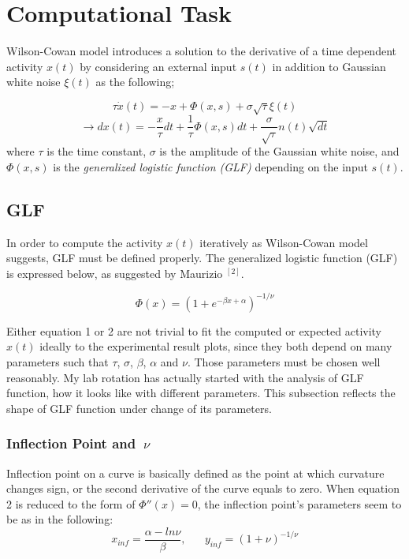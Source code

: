\documentclass[twocolumn]{article}
\begin{document}
 \section{Computational Task}
Wilson-Cowan model introduces a solution to the derivative of a time dependent activity $x(t)$ by considering an external input $s(t)$ in addition to Gaussian white noise $\xi(t)$ as the following;

\begin{equation}
 \tau\dot{x}(t)=-x+\Phi(x,s)+\sigma\sqrt{\tau}\xi(t)
\end{equation}
\begin{equation*}
\rightarrow dx(t)=-\frac{x}{\tau}dt+\frac{1}{\tau}\Phi(x,s)dt+\frac{\sigma}{\sqrt{\tau}}n(t)\sqrt{dt} 
\end{equation*}
where $\tau$ is the time constant, $\sigma$ is the amplitude of the Gaussian white noise, and $\Phi(x,s)$ is the \textit{generalized logistic function (GLF)} depending on the input $s(t)$.

\subsection{GLF}
In order to compute the activity $x(t)$ iteratively as Wilson-Cowan model suggests, GLF must be defined properly. The generalized logistic function (GLF) is expressed below, as suggested by Maurizio $^{[2]}$. 

\begin{equation}
 \Phi(x)=(1+e^{-\beta x+\alpha})^{-1/\nu}
\end{equation}

Either equation 1 or 2 are not trivial to fit the computed or expected activity $x(t)$ ideally to the experimental result plots, since they both depend on many parameters such that $\tau$, $\sigma$, $\beta$, $\alpha$ and $\nu$. Those parameters must be chosen well reasonably. My lab rotation has actually started with the analysis of GLF function, how it looks like with different parameters. This subsection reflects the shape of GLF function under change of its parameters.

 
\subsubsection{Inflection Point and $~ \nu$}
Inflection point on a curve is basically defined as the point at which curvature changes sign, or the second derivative of the curve equals to zero. When equation 2 is reduced to the form of $\Phi''(x)=0$, the inflection point's parameters seem to be as in the following:
\begin{equation*}
 x_{inf}=\dfrac{\alpha-ln\nu}{\beta},   \;\;\;\;\;\;        y_{inf}=(1+\nu)^{-1/\nu}
\end{equation*}
\end{document}
